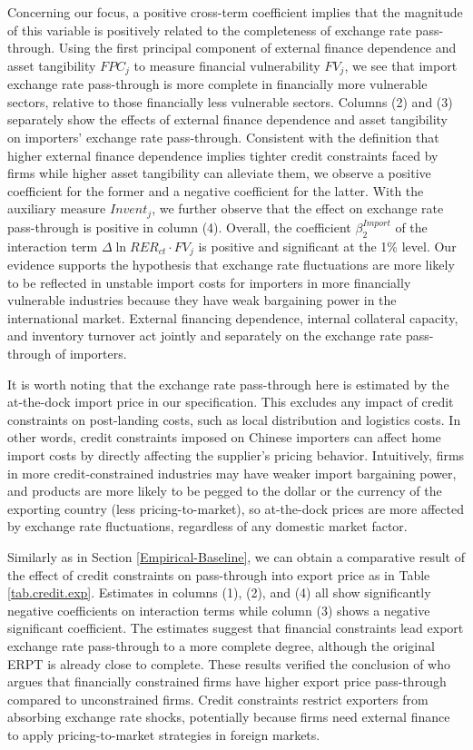 \documentclass[12pt]{article}
\begin{document}
Concerning our focus, a positive cross-term coefficient implies that the magnitude of this variable is positively related to the completeness of exchange rate pass-through. Using the first principal component of external finance dependence and asset tangibility $FPC_j$ to measure financial vulnerability $FV_j$, we see that import exchange rate pass-through is more complete in financially more vulnerable sectors, relative to those financially less vulnerable sectors. Columns (2) and (3) separately show the effects of external finance dependence and asset tangibility on importers' exchange rate pass-through. Consistent with the definition that higher external finance dependence implies tighter credit constraints faced by firms while higher asset tangibility can alleviate them, we observe a positive coefficient for the former and a negative coefficient for the latter. With the auxiliary measure $Invent_j$, we further observe that the effect on exchange rate pass-through is positive in column (4). Overall, the coefficient $\beta^{Import}_2$ of the interaction term $\Delta \ln RER_{ct} \cdot FV_{j}$ is positive and significant at the 1\% level. Our evidence supports the hypothesis that exchange rate fluctuations are more likely to be reflected in unstable import costs for importers in more financially vulnerable industries because they have weak bargaining power in the international market. External financing dependence, internal collateral capacity, and inventory turnover act jointly and separately on the exchange rate pass-through of importers.

It is worth noting that the exchange rate pass-through here is estimated by the at-the-dock import price in our specification. This excludes any impact of credit constraints on post-landing costs, such as local distribution and logistics costs. In other words, credit constraints imposed on Chinese importers can affect home import costs by directly affecting the supplier's pricing behavior. Intuitively, firms in more credit-constrained industries may have weaker import bargaining power, and products are more likely to be pegged to the dollar or the currency of the exporting country (less pricing-to-market), so at-the-dock prices are more affected by exchange rate fluctuations, regardless of any domestic market factor.

Similarly as in Section \ref{Empirical-Baseline}, we can obtain a comparative result of the effect of credit constraints on pass-through into export price as in Table \ref{tab.credit.exp}. Estimates in columns (1), (2), and (4) all show significantly negative coefficients on interaction terms while column (3) shows a negative significant coefficient. The estimates suggest that financial constraints lead export exchange rate pass-through to a more complete degree, although the original ERPT is already close to complete. These results verified the conclusion of \cite{strasser2013} who argues that financially constrained firms have higher export price pass-through compared to unconstrained firms. Credit constraints restrict exporters from absorbing exchange rate shocks, potentially because firms need external finance to apply pricing-to-market strategies in foreign markets.
\end{document}
